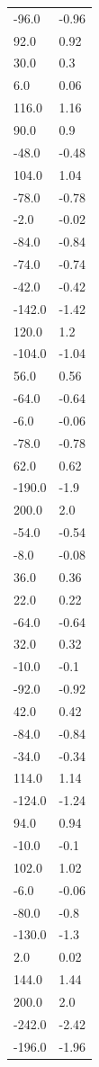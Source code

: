 \begin{longtable}{ll}
-96.0 & -0.96 \\
92.0 & 0.92 \\
30.0 & 0.3 \\
6.0 & 0.06 \\
116.0 & 1.16 \\
90.0 & 0.9 \\
-48.0 & -0.48 \\
104.0 & 1.04 \\
-78.0 & -0.78 \\
-2.0 & -0.02 \\
-84.0 & -0.84 \\
-74.0 & -0.74 \\
-42.0 & -0.42 \\
-142.0 & -1.42 \\
120.0 & 1.2 \\
-104.0 & -1.04 \\
56.0 & 0.56 \\
-64.0 & -0.64 \\
-6.0 & -0.06 \\
-78.0 & -0.78 \\
62.0 & 0.62 \\
-190.0 & -1.9 \\
200.0 & 2.0 \\
-54.0 & -0.54 \\
-8.0 & -0.08 \\
36.0 & 0.36 \\
22.0 & 0.22 \\
-64.0 & -0.64 \\
32.0 & 0.32 \\
-10.0 & -0.1 \\
-92.0 & -0.92 \\
42.0 & 0.42 \\
-84.0 & -0.84 \\
-34.0 & -0.34 \\
114.0 & 1.14 \\
-124.0 & -1.24 \\
94.0 & 0.94 \\
-10.0 & -0.1 \\
102.0 & 1.02 \\
-6.0 & -0.06 \\
-80.0 & -0.8 \\
-130.0 & -1.3 \\
2.0 & 0.02 \\
144.0 & 1.44 \\
200.0 & 2.0 \\
-242.0 & -2.42 \\
-196.0 & -1.96 \\

\end{longtable}
